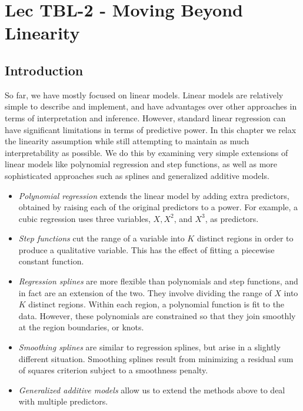 \chapter{Lec TBL-2 - Moving Beyond Linearity}

\section{Introduction}
So far, we have mostly focused on linear models. Linear models are relatively simple to describe and implement, and have advantages over other approaches in terms of interpretation and inference. However, standard linear regression can have significant limitations in terms of predictive power.  In this chapter we relax the linearity assumption while still attempting to maintain as much interpretability as possible. We do this by examining very simple extensions of linear models like polynomial regression and step functions, as well as more sophisticated approaches such as splines and generalized additive models.

\begin{itemize}
    \item \textit{Polynomial regression} extends the linear model by adding extra predictors, obtained by raising each of the original predictors to a power. For example, a cubic regression uses three variables, $X, X^2$, and $X^3$, as predictors.

    \item \textit{Step functions} cut the range of a variable into $K$ distinct regions in order to produce a qualitative variable. This has the effect of fitting a piecewise constant function.

    \item \textit{Regression splines} are more flexible than polynomials and step functions, and in fact are an extension of the two. They involve dividing the range of $X$ into $K$ distinct regions. Within each region, a polynomial function is fit to the data. However, these polynomials are constrained so that they join smoothly at the region boundaries, or knots.

    \item \textit{Smoothing splines} are similar to regression splines, but arise in a slightly different situation. Smoothing splines result from minimizing a residual sum of squares criterion subject to a smoothness penalty.

    \item \textit{Generalized additive models} allow us to extend the methods above to deal with multiple predictors.

\end{itemize}


